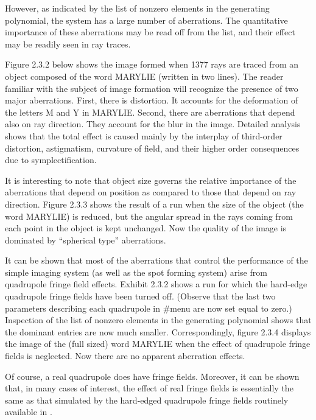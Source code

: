    However, as indicated by the list of nonzero elements in the
generating polynomial, the system has a large number of aberrations.  The
quantitative importance of these aberrations may be read off from the list,
and their effect may be readily seen in ray traces.

     Figure 2.3.2 below shows the image formed when 1377 rays are traced
from an object composed of the word MARYLIE (written in two lines).  The
reader familiar with the subject of image formation will recognize the
presence of two major aberrations.  First, there is distortion.  It
accounts for the deformation of the letters M and Y in MARYLIE.  Second,
there are aberrations that depend also on ray direction.  They account for
the blur in the image. Detailed analysis shows that the total effect is
caused mainly by the interplay of third-order distortion, astigmatism,
curvature of field, and their higher order consequences due to
symplectification.

     It is interesting to note that object size governs the relative
importance of the aberrations that depend on position as compared to those
that depend on ray direction.  Figure 2.3.3 shows the result of a \Mary
run when the size of the object (the word MARYLIE) is reduced, but the
angular spread in the rays coming from each point in the object is kept
unchanged. Now the quality of the image is dominated by ``spherical type''
aberrations. 

     It can be shown that most of the aberrations that control the
performance of the simple imaging system (as well as the spot forming
system) arise from quadrupole fringe field effects.  Exhibit 2.3.2 shows a 
run for which the hard-edge quadrupole fringe fields have been turned off.
(Observe that the last two parameters describing each quadrupole in \#menu
are now set equal to zero.)  Inspection of the list of nonzero elements in
the generating polynomial shows that the dominant entries are now much
smaller.  Correspondingly, figure 2.3.4 displays the image of the (full
sized) word MARYLIE when the effect of quadrupole fringe fields is
neglected.  Now there are no apparent aberration effects.

Of course, a real quadrupole does have fringe fields.  Moreover, it
can be shown that, in many cases of interest, the effect of real fringe
fields is essentially the same as that simulated by the hard-edged
quadrupole fringe fields routinely available in \Maryend.

